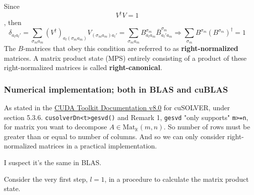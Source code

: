 \documentclass[10pt]{amsart}
\begin{document}
\begin{multicols*}{2}

Since 
\begin{equation}
V^{\dag} V =1
\end{equation},
then
\begin{equation}
	\delta_{a_l a_l'} = \sum_{\sigma_m a_m } (V^{\dag})_{a_l (\sigma_ma_m) } V_{(\sigma_m a_m) a_l'} = \sum_{\sigma_m a_m } B_{a_l a_m}^{\sigma_m} \overline{B}^{\sigma_m}_{a_l' a_m} \Longrightarrow \sum_{\sigma_m} \boxed{ B^{\sigma_m} (B^{\sigma_m})^{\dag} = 1 }
\end{equation}
The $B$-matrices that obey this condition are referred to as \textbf{right-normalized} matrices.  A matrix product state (MPS) entirely consisting of a product of these right-normalized matrices is called \textbf{right-canonical}.  

\subsubsection{Numerical implementation; both in BLAS and cuBLAS}

As stated in the \href{http://docs.nvidia.com/cuda/cusolver/index.html#cuds-lt-t-gt-gesvd}{CUDA Toolkit Documentation v8.0} for cuSOLVER, under section 5.3.6. \verb|cusolverDn<t>gesvd()| and Remark 1, \verb|gesvd| "only supports" \verb|m>=n|, for matrix you want to decompose $A\in \text{Mat}_{\mathbb{K}}(m,n)$.  So number of rows must be greater than or equal to number of columns.  And so we can only consider right-normalized matrices in a practical implementation.  

I suspect it's the same in BLAS.  

Consider the very first step, $l=1$, in a procedure to calculate the matrix product state.  


\end{multicols*}
\end{document}
